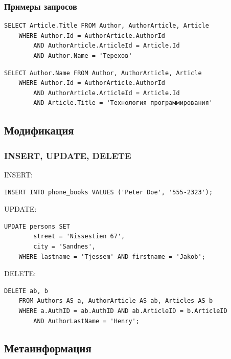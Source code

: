 \documentclass[xetex,mathserif,serif]{beamer}
\begin{document}
	\begin{frame}[fragile]
		\frametitle{Примеры запросов}
		\begin{small}
			\begin{verbatim}
SELECT Article.Title FROM Author, AuthorArticle, Article 
    WHERE Author.Id = AuthorArticle.AuthorId 
        AND AuthorArticle.ArticleId = Article.Id 
        AND Author.Name = 'Терехов'
			\end{verbatim}

			\vspace{3mm}
			\begin{verbatim}
SELECT Author.Name FROM Author, AuthorArticle, Article 
    WHERE Author.Id = AuthorArticle.AuthorId 
        AND AuthorArticle.ArticleId = Article.Id 
        AND Article.Title = 'Технология программирования'
			\end{verbatim}
		\end{small}
	\end{frame}

	\subsection{Модификация}

	\begin{frame}[fragile]
		\frametitle{INSERT, UPDATE, DELETE}
		\begin{small}
			INSERT:
			\begin{verbatim}
INSERT INTO phone_books VALUES ('Peter Doe', '555-2323');
			\end{verbatim}

			\vspace{3mm}
			UPDATE:
			\begin{verbatim}
UPDATE persons SET
        street = 'Nissestien 67',
        city = 'Sandnes',
    WHERE lastname = 'Tjessem' AND firstname = 'Jakob';
			\end{verbatim}

			\vspace{3mm}
			DELETE:
			\begin{verbatim}
DELETE ab, b
    FROM Authors AS a, AuthorArticle AS ab, Articles AS b
    WHERE a.AuthID = ab.AuthID AND ab.ArticleID = b.ArticleID
        AND AuthorLastName = 'Henry';
			\end{verbatim}
		\end{small}
	\end{frame}

	\subsection{Метаинформация}
\end{document}
